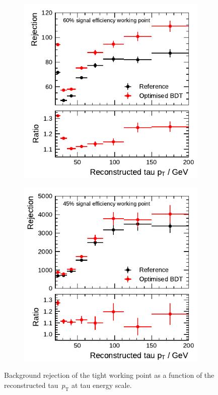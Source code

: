 \begin{figure}[htb]
  \centering
  \begin{subfigure}[t]{0.48\textwidth}
    \centering
    \includegraphics{./figures/bdt_perf/post_optimisation/rejection_tight_1p.pdf}
  \end{subfigure}\hfill
  \begin{subfigure}[t]{0.48\textwidth}
    \centering
    \includegraphics{./figures/bdt_perf/post_optimisation/rejection_tight_3p.pdf}
  \end{subfigure}
  \caption{Background rejection of the tight working point as a function of the
    reconstructed tau~$p_\text{T}$ at tau energy scale.}
  \label{fig:rejection_comparison}
\end{figure}

